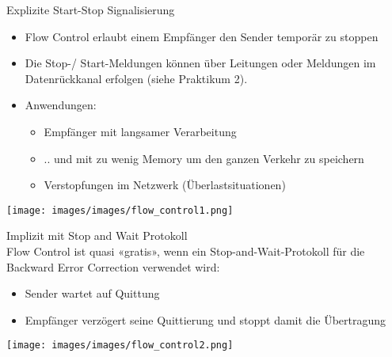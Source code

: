 \begin{definition}{Explizite Start-Stop Signalisierung}
    \begin{itemize}
        \item Flow Control erlaubt einem Empfänger den Sender temporär zu stoppen
        \item Die Stop-/ Start-Meldungen können über Leitungen oder Meldungen im Datenrückkanal erfolgen (siehe Praktikum 2).
        \item Anwendungen:
        \begin{itemize}
            \item Empfänger mit langsamer Verarbeitung
            \item .. und mit zu wenig Memory um den ganzen Verkehr zu speichern
            \item Verstopfungen im Netzwerk (Überlastsituationen)
        \end{itemize}
    \end{itemize}
        \texttt{[image: images/images/flow\_control1.png]}
\end{definition}

\begin{definition}{Implizit mit Stop and Wait Protokoll}\\
    Flow Control ist quasi «gratis», wenn ein Stop-and-Wait-Protokoll für die Backward Error Correction verwendet wird:
    \begin{itemize}
        \item Sender wartet auf Quittung
        \item Empfänger verzögert seine Quittierung und stoppt damit die Übertragung
    \end{itemize}
        \texttt{[image: images/images/flow\_control2.png]}
\end{definition}


